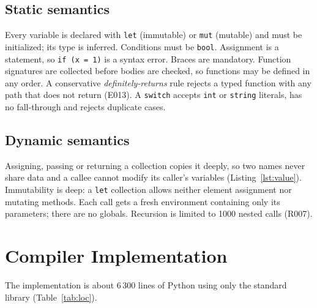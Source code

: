 \documentclass[conference]{IEEEtran}
\begin{document}
\subsection{Static semantics}
Every variable is declared with \texttt{let} (immutable) or \texttt{mut} (mutable) and must be initialized;
its type is inferred. Conditions must be \texttt{bool}. Assignment is a statement, so \texttt{if (x = 1)} is a
syntax error. Braces are mandatory. Function signatures are collected before bodies are checked, so functions
may be defined in any order. A conservative \emph{definitely-returns} rule rejects a typed function with any
path that does not return (E013). A \texttt{switch} accepts \texttt{int} or \texttt{string} literals, has no
fall-through and rejects duplicate cases.

\subsection{Dynamic semantics}
Assigning, passing or returning a collection copies it deeply, so two names never share data and a callee
cannot modify its caller's variables (Listing~\ref{lst:value}). Immutability is deep: a \texttt{let}
collection allows neither element assignment nor mutating methods. Each call gets a fresh environment
containing only its parameters; there are no globals. Recursion is limited to 1000 nested calls (R007).



\section{Compiler Implementation}\label{sec:impl}
The implementation is about 6\,300 lines of Python using only the standard library (Table~\ref{tab:loc}).
\end{document}
